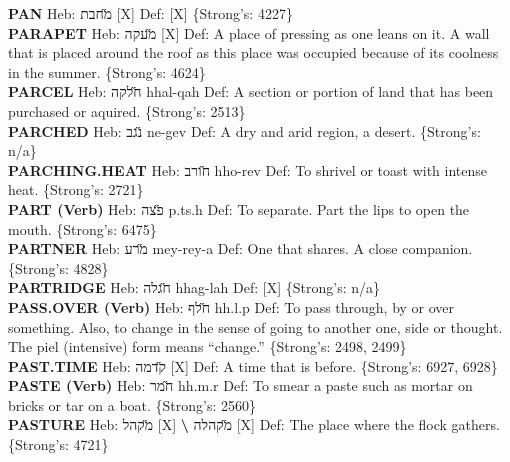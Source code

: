 {\textbf{PAN} Heb: {\large\H מחבת} {[}X{]} Def: {[}X{]} \{Strong's: 4227\}\hfill{}\\

\textbf{PARAPET} Heb: {\large\H מעקה} {[}X{]} Def: A place of pressing as one leans on it. A wall that is placed around the roof as this place was occupied because of its coolness in the summer. \{Strong's: 4624\}\hfill{}\\

\textbf{PARCEL} Heb: {\large\H חלקה} hhal-qah Def: A section or portion of land that has been purchased or aquired. \{Strong's: 2513\}\hfill{}\\

\textbf{PARCHED} Heb: {\large\H נגב} ne-gev Def: A dry and arid region, a desert. \{Strong's: n/a\}\hfill{}\\

\textbf{PARCHING.HEAT} Heb: {\large\H חורב} hho-rev Def: To shrivel or toast with intense heat. \{Strong's: 2721\}\hfill{}\\

\textbf{PART (Verb)} Heb: {\large\H פצה} p.ts.h Def: To separate. Part the lips to open the mouth. \{Strong's: 6475\}\hfill{}\\

\textbf{PARTNER} Heb: {\large\H מרע} mey-rey-a Def: One that shares. A close companion. \{Strong's: 4828\}\hfill{}\\

\textbf{PARTRIDGE} Heb: {\large\H חגלה} hhag-lah Def: {[}X{]} \{Strong's: n/a\}\hfill{}\\

\textbf{PASS.OVER (Verb)} Heb: {\large\H חלף} hh.l.p Def: To pass through, by or over something. Also, to change in the sense of going to another one, side or thought. The piel (intensive) form means ``change.'' \{Strong's: 2498, 2499\}\hfill{}\\

\textbf{PAST.TIME} Heb: {\large\H קדמה} {[}X{]} Def: A time that is before. \{Strong's: 6927, 6928\}\hfill{}\\

\textbf{PASTE (Verb)} Heb: {\large\H חמר} hh.m.r Def: To smear a paste such as mortar on bricks or tar on a boat. \{Strong's: 2560\}\hfill{}\\

\textbf{PASTURE} Heb: {\large\H מקהל} {[}X{]} \textbf{\textbackslash{}} {\large\H מקהלה} {[}X{]} Def: The place where the flock gathers. \{Strong's: 4721\}\hfill{}\\

}
